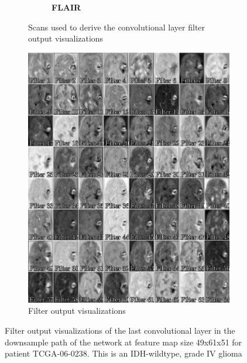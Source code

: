\begin{subappendices}
\begin{figure}
\begin{subfigure}[b]{0.77\textwidth}
\begin{subfigure}[b]{0.24\textwidth}
        \caption*{\normalfont \textbf{\acrshort{FLAIR}}\nopunct}
        \end{subfigure}
        \caption{Scans used to derive the convolutional layer filter output visualizations}
    \end{subfigure}
    \begin{subfigure}[b]{0.77\textwidth}
        \centering
        \includegraphics[width=\textwidth]{Figures/conv_filter_HGG_shallow.pdf}
        \caption{Filter output visualizations}\label{fig:prognosais_filter_hgg_shallow_filter_only}
    \end{subfigure}
    \caption{Filter output visualizations of the last convolutional layer in the downsample path of the network at feature map size 49x61x51 for patient TCGA-06-0238.
    This is an \acrshort{IDH}-wildtype, grade IV glioma}\label{fig:filter_hgg_shallow}
\end{figure}


\end{subappendices}
